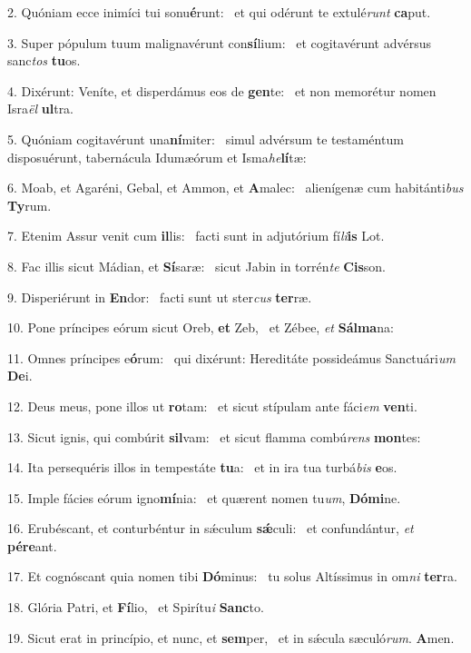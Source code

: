 2. Quóniam ecce inimíci tui sonu\textbf{é}runt: \ast\  et qui odérunt te extulé\textit{runt} \textbf{ca}put.\

3. Super pópulum tuum malignavérunt con\textbf{sí}lium: \ast\  et cogitavérunt advérsus sanc\textit{tos} \textbf{tu}os.\

4. Dixérunt: Veníte, et disperdámus eos de \textbf{gen}te: \ast\  et non memorétur nomen Isra\textit{ël} \textbf{ul}tra.\

5. Quóniam cogitavérunt una\textbf{ní}miter: \ast\  simul advérsum te testaméntum disposuérunt, tabernácula Idumæórum et Isma\textit{he}\textbf{lí}tæ:\

6. Moab, et Agaréni, Gebal, et Ammon, et \textbf{A}malec: \ast\  alienígenæ cum habitánti\textit{bus} \textbf{Ty}rum.\

7. Etenim Assur venit cum \textbf{il}lis: \ast\  facti sunt in adjutórium fí\textit{li}\textbf{is} Lot.\

8. Fac illis sicut Mádian, et \textbf{Sí}saræ: \ast\  sicut Jabin in torrén\textit{te} \textbf{Cis}son.\

9. Disperiérunt in \textbf{En}dor: \ast\  facti sunt ut ster\textit{cus} \textbf{ter}ræ.\

10. Pone príncipes eórum sicut Oreb, \textbf{et} Zeb, \ast\  et Zébee, \textit{et} \textbf{Sál}\textbf{ma}na:\

11. Omnes príncipes e\textbf{ó}rum: \ast\  qui dixérunt: Hereditáte possideámus Sanctuári\textit{um} \textbf{De}i.\

12. Deus meus, pone illos ut \textbf{ro}tam: \ast\  et sicut stípulam ante fáci\textit{em} \textbf{ven}ti.\

13. Sicut ignis, qui combúrit \textbf{sil}vam: \ast\  et sicut flamma combú\textit{rens} \textbf{mon}tes:\

14. Ita persequéris illos in tempestáte \textbf{tu}a: \ast\  et in ira tua turbá\textit{bis} \textbf{e}os.\

15. Imple fácies eórum igno\textbf{mí}nia: \ast\  et quærent nomen tu\textit{um}, \textbf{Dó}\textbf{mi}ne.\

16. Erubéscant, et conturbéntur in sǽculum \textbf{sǽ}culi: \ast\  et confundántur, \textit{et} \textbf{pér}\textbf{e}ant.\

17. Et cognóscant quia nomen tibi \textbf{Dó}minus: \ast\  tu solus Altíssimus in om\textit{ni} \textbf{ter}ra.\

18. Glória Patri, et \textbf{Fí}lio, \ast\  et Spirítu\textit{i} \textbf{Sanc}to.\

19. Sicut erat in princípio, et nunc, et \textbf{sem}per, \ast\  et in sǽcula sæculó\textit{rum}. \textbf{A}men.\

